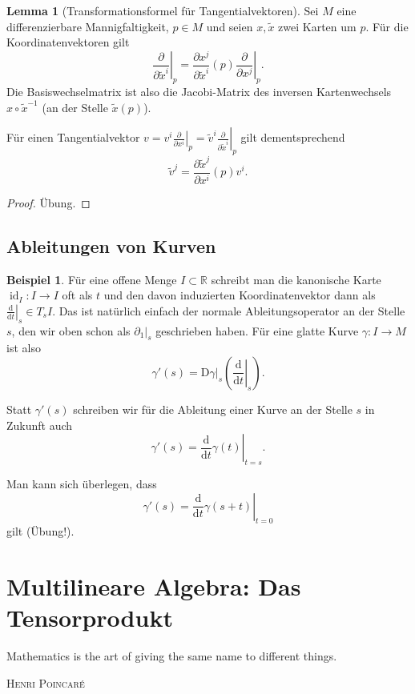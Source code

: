 \documentclass[a4paper]{scrreprt}
\numberwithin{equation}{chapter}
\newcommand{\D}{\mathrm{d}}
\newcommand{\DD}{\mathrm{D}}
\DeclareMathOperator{\id}{id}
\theoremstyle{definition}
\newtheorem{lemma}[defn]{Lemma}
\newtheorem{bsp}[defn]{Beispiel}
\newcommand{\bewUeb}{\begin{proof}Übung.\end{proof}}
\begin{document}
\begin{lemma}[Transformationsformel für Tangentialvektoren]
	Sei $M$ eine differenzierbare Mannigfaltigkeit, $p\in M$ und seien $x, \tilde x$ zwei Karten um $p$. Für die Koordinatenvektoren gilt
	\[\left.\frac{\partial}{\partial \tilde x^i}\right|_p = \frac{\partial x^j}{\partial \tilde x^i}(p) \left.\frac{\partial}{\partial x^j}\right|_p.\]
	Die Basiswechselmatrix ist also die Jacobi-Matrix des inversen Kartenwechsels $x \circ \tilde x^{-1}$ (an der Stelle $\tilde x(p)$).

	Für einen Tangentialvektor $v = v^i \left.\frac{\partial}{\partial x^i}\right|_p = \tilde v^i \left.\frac{\partial}{\partial \tilde x^i}\right|_p$ gilt dementsprechend
	\[\tilde v^j = \frac{\partial \tilde x^j}{\partial x^i}(p) v^i.\]

	\bewUeb
\end{lemma}

\section{Ableitungen von Kurven}
\begin{bsp}
	Für eine offene Menge $I\subset\mathbb R$ schreibt man die kanonische Karte $\id_I\colon I \to I$ oft als $t$ und den davon induzierten Koordinatenvektor dann als $\left.\frac{\D}{\D t}\right|_s \in T_sI$. Das ist natürlich einfach der normale Ableitungsoperator an der Stelle $s$, den wir oben schon als $\left.\partial_1\right|_s$ geschrieben haben. Für eine glatte Kurve $\gamma\colon I \to M$ ist also
	\[\gamma'(s) = \left.\DD\gamma\right|_s \left(\left.\frac{\D}{\D t}\right|_s\right).\]

	Statt $\gamma'(s)$ schreiben wir für die Ableitung einer Kurve an der Stelle $s$ in Zukunft auch
	\[\gamma'(s) = \left.\frac{\D}{\D t}\gamma(t)\right|_{t = s}.\]

	Man kann sich überlegen, dass
	\[\gamma'(s) = \left.\frac{\D}{\D t}\gamma(s + t)\right|_{t = 0}\]
	gilt (Übung!).
\end{bsp}


\chapter{Multilineare Algebra: Das Tensorprodukt}
\epigraph{Mathematics is the art of giving the same name to different things.}
{\textsc{Henri Poincaré}}
\end{document}
